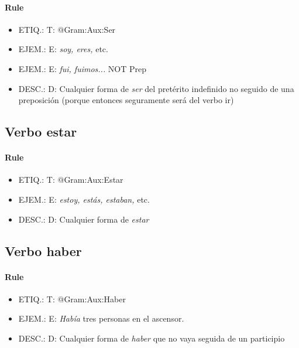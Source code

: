 \documentclass[11pt]{report}
\begin{document}
\paragraph*{Rule}
\begin{itemize}
\item ETIQ.:  T: @Gram:Aux:Ser
\item EJEM.:  E: \emph{soy, eres,} etc. 
\item EJEM.:  E: \emph{fui, fuimos...} NOT Prep 
\item DESC.:  D: Cualquier forma de \emph{ser} del pretérito indefinido no seguido de una preposición (porque entonces seguramente será del verbo ir)
\end{itemize}

\subsection{Verbo estar}
\paragraph*{Rule}
\begin{itemize}
\item ETIQ.:  T: @Gram:Aux:Estar
\item EJEM.:  E: \emph{estoy, estás, estaban,} etc. 
\item DESC.:  D: Cualquier forma de \emph{estar}
\end{itemize}

\subsection{Verbo haber}
\paragraph*{Rule}
\begin{itemize}
\item ETIQ.:  T: @Gram:Aux:Haber
\item EJEM.:  E: \emph{Había} tres personas en el ascensor. 
\item DESC.:  D: Cualquier forma de \emph{haber} que no vaya seguida de un participio
\end{itemize}
\end{document}

